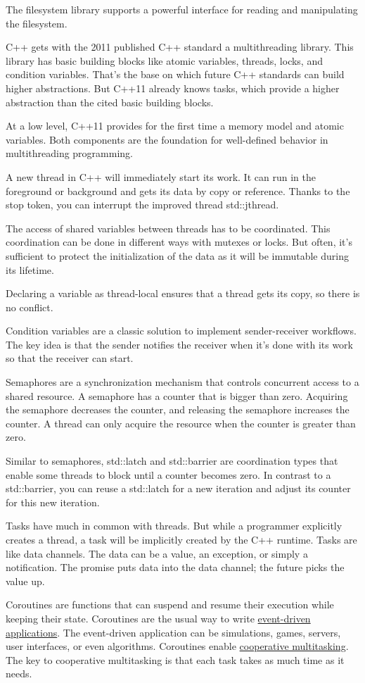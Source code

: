 The filesystem library supports a powerful interface for reading and manipulating the filesystem.


C++ gets with the 2011 published C++ standard a multithreading library. This library has basic building blocks like atomic variables, threads, locks, and condition variables. That’s the base on which future C++ standards can build higher abstractions. But C++11 already knows tasks, which provide a higher abstraction than the cited basic building blocks.

At a low level, C++11 provides for the first time a memory model and atomic variables. Both components are the foundation for well-defined behavior in multithreading programming.

A new thread in C++ will immediately start its work. It can run in the foreground or background and gets its data by copy or reference. Thanks to the stop token, you can interrupt the improved thread std::jthread.

The access of shared variables between threads has to be coordinated. This coordination can be done in different ways with mutexes or locks. But often, it’s sufficient to protect the initialization of the data as it will be immutable during its lifetime.

Declaring a variable as thread-local ensures that a thread gets its copy, so there is no conflict.

Condition variables are a classic solution to implement sender-receiver workflows. The key idea is that the sender notifies the receiver when it’s done with its work so that the receiver can start.

Semaphores are a synchronization mechanism that controls concurrent access to a shared resource.
A semaphore has a counter that is bigger than zero. Acquiring the semaphore decreases the counter, and releasing the semaphore increases the counter. A thread can only acquire the resource when the counter is greater than zero.

Similar to semaphores, std::latch and std::barrier are coordination types that enable some threads to block until a counter becomes zero. In contrast to a std::barrier, you can reuse a std::latch for a new iteration and adjust its counter for this new iteration.

Tasks have much in common with threads. But while a programmer explicitly creates a thread, a task will be implicitly created by the C++ runtime. Tasks are like data channels. The data can be a value, an exception, or simply a notification. The promise puts data into the data channel; the future picks the value up.

Coroutines are functions that can suspend and resume their execution while keeping their state. Coroutines are the usual way to write \href{https://en.wikipedia.org/wiki/Event-driven_programming}{event-driven applications}. The event-driven application can be simulations, games, servers, user interfaces, or even algorithms. Coroutines enable \href{https://de.wikipedia.org/wiki/Multitasking}{cooperative multitasking}. The key to cooperative multitasking is that each task takes as much time as it needs.